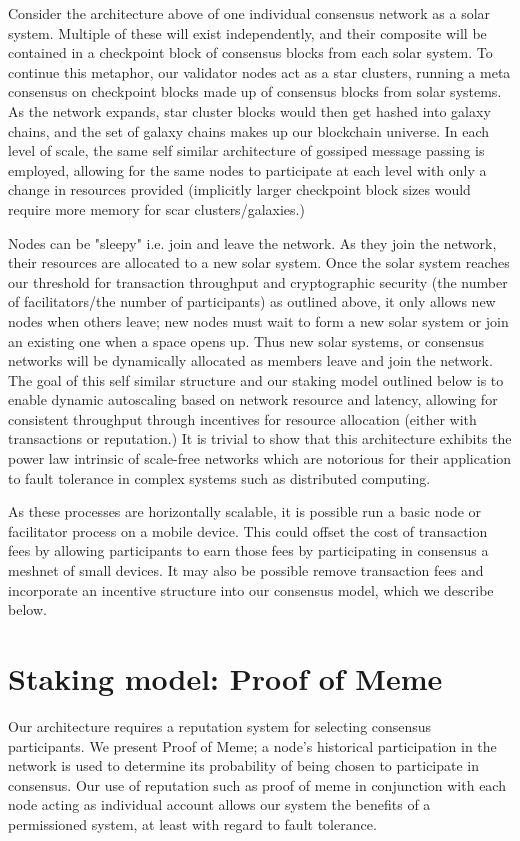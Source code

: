 \documentclass{article}
\begin{document}
Consider the architecture above of one individual consensus network as a solar system. Multiple of these will exist independently, and their composite will be contained in a checkpoint block of consensus blocks from each solar system. To continue this metaphor, our validator nodes act as a star clusters, running a meta consensus on checkpoint blocks made up of  consensus blocks from solar systems. As the network expands, star cluster blocks would then get hashed into galaxy chains, and the set of galaxy chains makes up our blockchain universe. In each level of scale, the same self similar architecture of gossiped message passing is employed, allowing for the same nodes to participate at each level with only a change in resources provided (implicitly larger checkpoint block sizes would require more memory for scar clusters/galaxies.)

Nodes can be "sleepy" i.e. join and leave the network. As they join the network, their resources are allocated to a new solar system. Once the solar system reaches our threshold for transaction throughput and cryptographic security (the number of facilitators/the number of participants) as outlined above, it only allows new nodes when others leave; new nodes must wait to form a new solar system or join an existing one when a space opens up. Thus new solar systems, or consensus networks will be dynamically allocated as members leave and join the network. The goal of this self similar structure and our staking model outlined below is to enable dynamic autoscaling based on network resource and latency, allowing for consistent throughput through incentives for resource allocation (either with transactions or reputation.) It is trivial to show that this architecture exhibits the power law intrinsic of scale-free networks which are notorious for their application to fault tolerance in complex systems such as distributed computing.

As these processes are horizontally scalable, it is possible run a basic node or facilitator process on a mobile device. This could offset the cost of transaction fees by allowing participants to earn those fees by participating in consensus a meshnet of small devices. It may also be possible remove transaction fees and incorporate an incentive structure into our consensus model, which we describe below.

\section{Staking model: Proof of Meme}
Our architecture requires a reputation system for selecting consensus participants. We present Proof of Meme; a node's historical participation in the network is used to determine its probability of being chosen to participate in consensus. Our use of reputation such as proof of meme in conjunction with each node acting as individual account allows our system the benefits of a permissioned system, at least with regard to fault tolerance.
\end{document}

